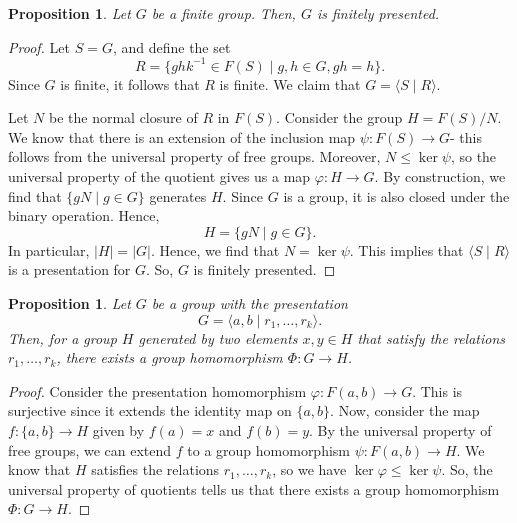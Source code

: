 \documentclass[a4paper, openany]{memoir}
\theoremstyle{definition}
\theoremstyle{plain}
\newtheorem{proposition}[definition]{Proposition}
\begin{document}
    \begin{proposition}
        Let $G$ be a finite group. Then, $G$ is finitely presented.
    \end{proposition}
    \begin{proof}
        Let $S = G$, and define the set
        \[R = \{ghk^{-1} \in F(S) \mid g, h \in G, gh = h\}.\]
        Since $G$ is finite, it follows that $R$ is finite. We claim that $G = \langle S \mid R \rangle$. 
        
        Let $N$ be the normal closure of $R$ in $F(S)$. Consider the group $H = F(S)/N$. We know that there is an extension of the inclusion map $\psi \colon F(S) \to G$- this follows from the universal property of free groups. Moreover, $N \leq \ker \psi$, so the universal property of the quotient gives us a map $\varphi \colon H \to G$. By construction, we find that $\{gN \mid g \in G\}$ generates $H$. Since $G$ is a group, it is also closed under the binary operation. Hence, 
        \[H = \{gN \mid g \in G\}.\]
        In particular, $|H| = |G|$. Hence, we find that $N = \ker \psi$. This implies that $\langle S \mid R \rangle$ is a presentation for $G$. So, $G$ is finitely presented.
    \end{proof}

    \begin{proposition}
        Let $G$ be a group with the presentation
        \[G = \langle a, b \mid r_1, \dots, r_k \rangle.\]
        Then, for a group $H$ generated by two elements $x, y \in H$ that satisfy the relations $r_1, \dots, r_k$, there exists a group homomorphism $\Phi \colon G \to H$.
    \end{proposition}
    \begin{proof}
        Consider the presentation homomorphism $\varphi \colon F(a, b) \to G$. This is surjective since it extends the identity map on $\{a, b\}$. Now, consider the map $f \colon \{a, b\} \to H$ given by $f(a) = x$ and $f(b) = y$. By the universal property of free groups, we can extend $f$ to a group homomorphism $\psi \colon F(a, b) \to H$. We know that $H$ satisfies the relations $r_1, \dots, r_k$, so we have $\ker \varphi \leq \ker \psi$. So, the universal property of quotients tells us that there exists a group homomorphism $\Phi \colon G \to H$.
    \end{proof}
\end{document}
